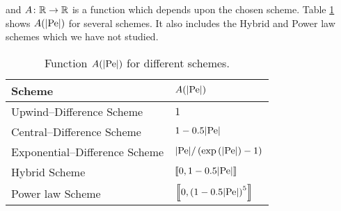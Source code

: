 and $A \colon \mathbb{R} \rightarrow \mathbb{R}$ is a function which depends upon the
chosen scheme. Table \ref{tab:small_molecule_schemes_coefficients} shows
$A(\abs{\mathrm{Pe}})$ for several schemes. It also includes the Hybrid and Power
law schemes which we have not studied.
\begin{table}[ht]
	\centering
	\begin{tabular}{ll}
		\toprule[0.50mm]
		Scheme & $A(\abs{\mathrm{Pe}})$ \\
		\midrule[0.25mm]
		Upwind--Difference Scheme & 
		$1$ \\

		Central--Difference Scheme & 
		$1 - 0.5 \abs{\mathrm{Pe}}$ \\

		Exponential--Difference Scheme & 
		$\abs{\mathrm{Pe}} / \left( \exp\left( \abs{\mathrm{Pe}} \right) - 1 \right)$ \\

		Hybrid Scheme & 
		$\left\llbracket 0, 1 - 0.5 \abs{\mathrm{Pe}} \right\rrbracket$\\

		Power law Scheme & 
		$\left\llbracket 0, \left(1 - 0.5 \abs{\mathrm{Pe}}\right)^5 \right\rrbracket$\\
		\bottomrule[0.50mm]
	\end{tabular}
	\captionsetup{width=0.7\linewidth}
	\caption{Function $A(\abs{\mathrm{Pe}})$ for different schemes\cite{patankar2008numerical}.}
	\label{tab:small_molecule_schemes_coefficients}
\end{table}


